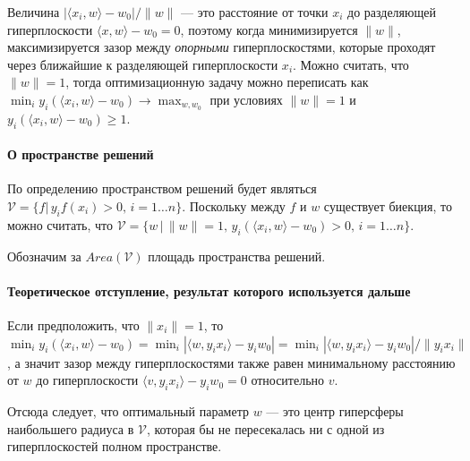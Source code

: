 \documentclass[]{article}
\let\oldparagraph\paragraph
\renewcommand{\paragraph}[1]{\oldparagraph{#1}\mbox{}}
\begin{document}
Величина \(|\langle x_i, w \rangle - w_0|/\|w\|\) --- это расстояние от
точки \(x_i\) до разделяющей гиперплоскости
\(\langle x, w \rangle - w_0 = 0\), поэтому когда минимизируется
\(\|w\|\), максимизируется зазор между \emph{опорными} гиперплоскостями,
которые проходят через ближайшие к разделяющей гиперплоскости \(x_i\).
Можно считать, что \(\|w\| = 1\), тогда оптимизационную задачу можно
переписать как
\(\min_i y_i (\langle x_i, w \rangle - w_0) \to \max_{w, w_0}\) при
условиях \(\|w\| = 1\) и \(y_i(\langle x_i, w \rangle - w_0) \geq 1\).

\paragraph{О пространстве
решений}\label{ux43e-ux43fux440ux43eux441ux442ux440ux430ux43dux441ux442ux432ux435-ux440ux435ux448ux435ux43dux438ux439}

По определению пространством решений будет являться
\(\mathcal{V} = \{f |\, y_if(x_i) > 0,\, i = 1 \ldots n\}\). Поскольку
между \(f\) и \(w\) существует биекция, то можно считать, что
\(\mathcal{V} = \{w\,|\, \|w\| = 1,\, y_i (\langle x_i, w \rangle - w_0) > 0,\, i = 1\ldots n \}\).

Обозначим за \(Area(\mathcal{V})\) площадь пространства решений.

\paragraph{Теоретическое отступление, результат которого используется
дальше}\label{ux442ux435ux43eux440ux435ux442ux438ux447ux435ux441ux43aux43eux435-ux43eux442ux441ux442ux443ux43fux43bux435ux43dux438ux435-ux440ux435ux437ux443ux43bux44cux442ux430ux442-ux43aux43eux442ux43eux440ux43eux433ux43e-ux438ux441ux43fux43eux43bux44cux437ux443ux435ux442ux441ux44f-ux434ux430ux43bux44cux448ux435}

Если предположить, что \(\|x_i\| = 1\), то
\(\min_i y_i(\langle x_i, w \rangle - w_0) = \min_i |\langle w, y_i x_i\rangle - y_i w_0| = \min_i |\langle w, y_i x_i\rangle - y_i w_0|/\|y_ix_i\|\),
а значит зазор между гиперплоскостями также равен минимальному
расстоянию от \(w\) до гиперплоскости
\(\langle v, y_i x_i\rangle - y_i w_0 = 0\) относительно \(v\).

Отсюда следует, что оптимальный параметр \(w\) --- это центр гиперсферы
наибольшего радиуса в \(\mathcal{V}\), которая бы не пересекалась ни с
одной из гиперплоскостей полном пространстве.
\end{document}
